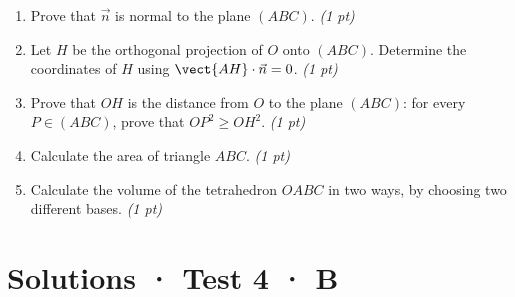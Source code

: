 \begin{enumerate}

\item Prove that $\vec n$ is normal to the plane $(ABC)$. \hfill\textit{(1 pt)}

\item Let $H$ be the orthogonal projection of $O$ onto $(ABC)$. Determine the coordinates of $H$ using $\vect{AH}\cdot\vec n=0$. \hfill\textit{(1 pt)}

\item Prove that $OH$ is the distance from $O$ to the plane $(ABC)$: for every $P\in(ABC)$, prove that $OP^2\ge OH^2$. \hfill\textit{(1 pt)}

\item Calculate the area of triangle $ABC$. \hfill\textit{(1 pt)}

\item Calculate the volume of the tetrahedron $OABC$ in two ways, by choosing two different bases. \hfill\textit{(1 pt)}

\end{enumerate}

\ifmxteacher\mxnewpage

\section*{Solutions · Test 4 · B}\label{cor:6-4}

